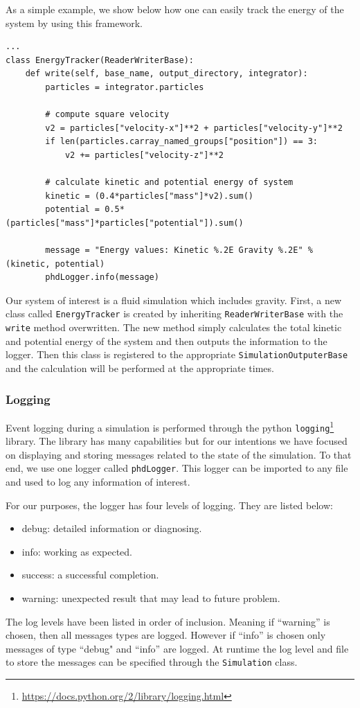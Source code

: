 As a simple example, we show below how one can easily track the energy of the system
by using this framework.
\begin{lstlisting}
...
class EnergyTracker(ReaderWriterBase):
	def write(self, base_name, output_directory, integrator):
   		particles = integrator.particles
        
   		# compute square velocity
        v2 = particles["velocity-x"]**2 + particles["velocity-y"]**2
        if len(particles.carray_named_groups["position"]) == 3:
        	v2 += particles["velocity-z"]**2
            
        # calculate kinetic and potential energy of system    
        kinetic = (0.4*particles["mass"]*v2).sum()
        potential = 0.5*(particles["mass"]*particles["potential"]).sum()
        
        message = "Energy values: Kinetic %.2E Gravity %.2E" % (kinetic, potential)
        phdLogger.info(message)
\end{lstlisting}
Our system of interest is a fluid simulation which includes gravity.
First, a new class called \lstinline{EnergyTracker} is created by inheriting \lstinline{ReaderWriterBase}
with the \lstinline{write} method overwritten. The new method simply calculates the total kinetic
and potential energy of the system and then outputs the information to the logger. Then this
class is registered to the appropriate \lstinline{SimulationOutputerBase} and the calculation
will be performed at the appropriate times.

\subsubsection{Logging}
\label{sec.logging}
Event logging during a simulation is performed through the python 
\texttt{logging}\footnote{\url{https://docs.python.org/2/library/logging.html}} library. The library has 
many capabilities but for our intentions we have focused on displaying and storing messages related to the
state of the simulation. To that end, we use one logger called \lstinline{phdLogger}. This 
logger can be imported to any file and used to log any information of interest.

For our purposes, the logger has four levels of logging. They are listed below:
\begin{itemize}
	\item debug: detailed information or diagnosing.
    \item info: working as expected.
    \item success: a successful completion. 
    \item warning: unexpected result that may lead to future problem.
\end{itemize}
The log levels have been listed in order of inclusion. Meaning if ``warning'' is chosen, then all messages
types are logged. However if ``info'' is chosen only messages of type ``debug" and ``info'' are logged.
At runtime the log level and file to store the messages can be specified through the 
\lstinline{Simulation} class.

